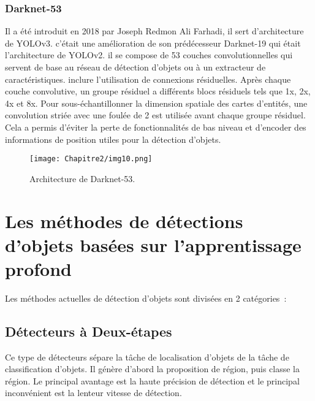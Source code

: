            \subsubsection{Darknet-53} \cite{darknet_paper}
           Il a été introduit en 2018 par Joseph Redmon Ali Farhadi, il sert d'architecture de YOLOv3. c'était une amélioration de son prédécesseur Darknet-19 qui était l'architecture de YOLOv2. il se compose de 53 couches convolutionnelles qui servent de base au réseau de détection d'objets ou à un extracteur de caractéristiques. inclure l'utilisation de connexions résiduelles. Après chaque couche convolutive, un groupe résiduel a différents blocs résiduels tels que 1x, 2x, 4x et 8x. Pour sous-échantillonner la dimension spatiale des cartes d'entités, une convolution striée avec une foulée de 2 est utilisée avant chaque groupe résiduel. Cela a permis d'éviter la perte de fonctionnalités de bas niveau et d'encoder des informations de position utiles pour la détection d'objets.
           \begin{figure}[H]
                \centering
                \texttt{[image: Chapitre2/img10.png]}
                \caption{Architecture de Darknet-53.}
                \label{img10}
                \end{figure}


\section{Les méthodes de détections d'objets basées sur l'apprentissage profond} 
Les méthodes actuelles de détection d'objets sont divisées en 2 catégories :
     \subsection{Détecteurs à Deux-étapes}
     Ce type de détecteurs sépare la tâche de localisation d'objets de la tâche de classification d'objets. Il génère d'abord la proposition de région, puis classe la région. Le principal avantage est la haute précision de détection et le principal inconvénient est la lenteur vitesse de détection.
     
